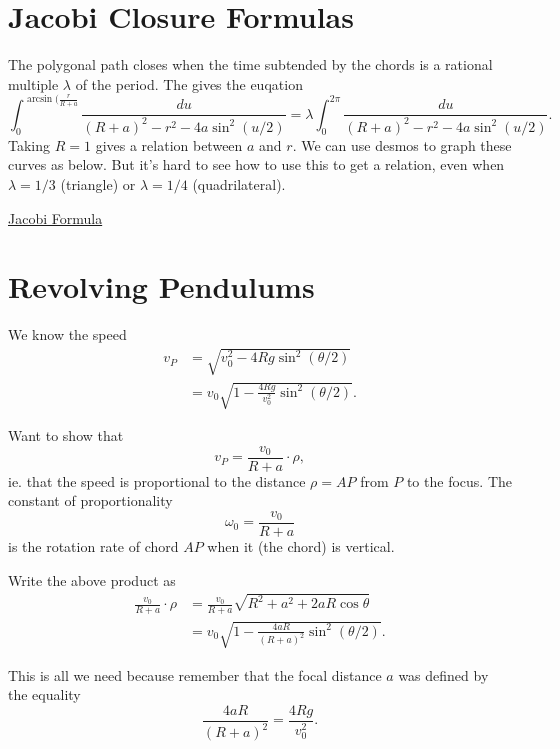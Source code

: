 \documentclass{ximera}
\begin{document}
\section{Jacobi Closure Formulas}

The polygonal path closes when the time subtended by the chords is a rational multiple $\lambda$ of the period. The gives the euqation
\[
     \int_0^{\arcsin(\frac{r}{R+a}} \frac{du}{(R+a)^2 - r^2 - 4a\sin^2(u/2)} = \lambda \int_0^{2\pi} \frac{du}{(R+a)^2 - r^2 - 4a\sin^2(u/2)} .
\]
Taking $R=1$ gives a relation between $a$ and $r$. We can use desmos to graph these curves as below. But it's hard to see how to use this to get a relation, even when $\lambda=1/3$ (triangle) or $\lambda  = 1/4$ (quadrilateral).


\begin{onlineOnly}
    \begin{center}
\end{center}
\end{onlineOnly}

\href{https://www.desmos.com/calculator/wnef0tpllt}{Jacobi Formula}



\section*{Revolving Pendulums}

We know the speed
\begin{align*}
    v_P &= \sqrt{v_0^2-4Rg \sin^2 (\theta/2)}  \\
           &=v_0 \sqrt{1-\frac{4Rg}{v_0^2} \sin^2 (\theta/2)} .
\end{align*}

Want to show that 
\[
    v_P = \frac{v_0}{R+a} \cdot \rho ,
\]
ie. that the speed is proportional to the distance $\rho = AP$ from $P$ to the focus. The constant of proportionality
\[
           \omega_0 = \frac{v_0}{R+a}
\]
is the rotation rate of chord $AP$ when it (the chord) is vertical.

Write the above product as
\begin{align*}
   \frac{v_0}{R+a} \cdot \rho  &= \frac{v_0}{R+a} \sqrt{R^2 + a^2 + 2aR \cos\theta} \\
                                         &= v_0 \sqrt{1 - \frac{4aR}{(R+a)^2} \sin^2 (\theta/2)} .
\end{align*}

This is all we need because remember that the focal distance $a$ was defined by the equality
\[
   \frac{4aR}{(R+a)^2} = \frac{4Rg}{v_0^2} .
\]
\end{document}
